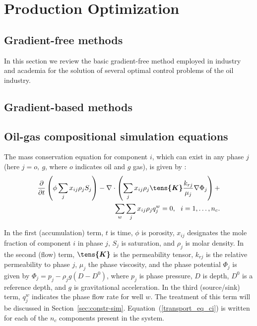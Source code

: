 
\chapter{Production Optimization}


\section{Gradient-free methods}
In this section we review the basic gradient-free method
employed in industry and academia for the solution of several
optimal control problems of the oil industry.
\section{Gradient-based methods}



\section{Oil-gas compositional simulation equations} \label{sec:forward}


The mass conservation equation for component $i$, which can exist in any
phase $j$ (here $j=o,~g$, where $o$ indicates oil and $g$ gas), is given
by \cite{Cao:Thesis,Voskov_nonlinear:2009,Voskov:2012}:
%
\begin{align}
\label{transport_eq_ci}
\dfrac{\partial}{\partial t} \left(\phi
  \sum_{j} x_{ij} \rho_j S_j \right)
    - \nabla \cdot \left ( \sum_{j} x_{ij} \rho_j  \boldsymbol{\tens{K}}
      \dfrac{k_{rj}}{\mu_j}\nabla \Phi_j \right ) + \\ \sum_{w} \sum_{j} x_{ij} \rho_j q_j^w = 0, \ \ i = 1,\ldots,n_c. \nonumber
\end{align}
%

In the first (accumulation) term, $t$ is time, $\phi$ is porosity, $x_{ij}$
designates the mole fraction of component $i$ in phase $j$, $S_j$ is saturation,
and $\rho_j$ is molar density. In the second (flow) term,  $\boldsymbol{\tens{K}}$ 
is the permeability tensor, $k_{rj}$ is the relative permeability to
phase $j$, $\mu_j$ the phase viscosity, and the phase potential
$\Phi_j$ is given by $\Phi_j = p_j-\rho_j g(D-D^0)$, where $p_j$ is
phase pressure, $D$ is depth, $D^0$ is a reference depth, and $g$ is
gravitational acceleration. In the third (source/sink) term, $q_j^w$
indicates the phase flow rate for well $w$. The treatment of this term will be discussed in Section~\ref{sec:constr-sim}. Equation~(\ref{transport_eq_ci}) is written for each of the $n_c$
components present in the system.


